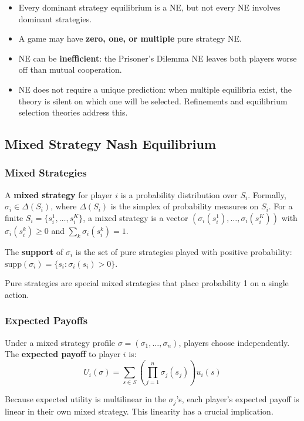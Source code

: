 \documentclass[hidelinks]{article}
\begin{document}
\begin{itemize}
    \item Every dominant strategy equilibrium is a NE, but not every NE involves dominant strategies.
    \item A game may have \textbf{zero, one, or multiple} pure strategy NE.
    \item NE can be \textbf{inefficient}: the Prisoner's Dilemma NE leaves both players worse off than mutual cooperation.
    \item NE does not require a unique prediction: when multiple equilibria exist, the theory is silent on which one will be selected. Refinements and equilibrium selection theories address this.
\end{itemize}

\subsection{Mixed Strategy Nash Equilibrium}

\subsubsection{Mixed Strategies}

A \textbf{mixed strategy} for player $i$ is a probability distribution over $S_i$. Formally, $\sigma_i \in \Delta(S_i)$, where $\Delta(S_i)$ is the simplex of probability measures on $S_i$. For a finite $S_i = \{s_i^1, \ldots, s_i^K\}$, a mixed strategy is a vector $(\sigma_i(s_i^1), \ldots, \sigma_i(s_i^K))$ with $\sigma_i(s_i^k) \geq 0$ and $\sum_k \sigma_i(s_i^k) = 1$.

The \textbf{support} of $\sigma_i$ is the set of pure strategies played with positive probability: $\mathrm{supp}(\sigma_i) = \{s_i : \sigma_i(s_i) > 0\}$.

Pure strategies are special mixed strategies that place probability 1 on a single action.

\subsubsection{Expected Payoffs}

Under a mixed strategy profile $\sigma = (\sigma_1, \ldots, \sigma_n)$, players choose independently. The \textbf{expected payoff} to player $i$ is:
\[
U_i(\sigma) = \sum_{s \in S} \left(\prod_{j=1}^n \sigma_j(s_j)\right) u_i(s)
\]

Because expected utility is multilinear in the $\sigma_j$'s, each player's expected payoff is linear in their own mixed strategy. This linearity has a crucial implication.
\end{document}
